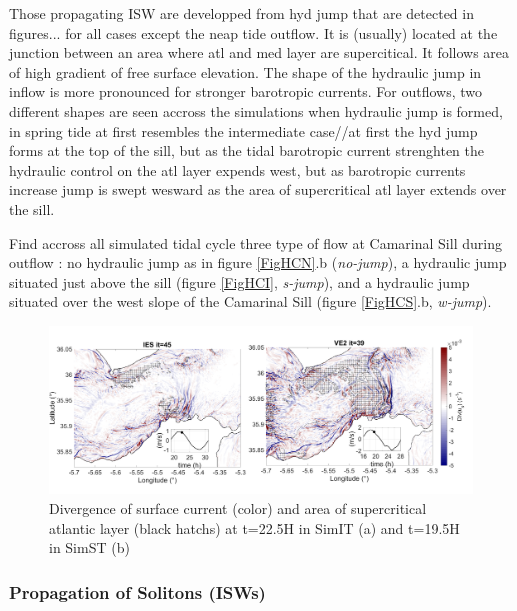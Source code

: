 Those propagating ISW are developped from hyd jump that are detected in figures... for all cases except the neap tide outflow. It is (usually) located at the junction between an area where atl and med layer are supercitical. It follows area of high gradient of free surface elevation. The shape of the hydraulic jump in inflow is more pronounced for stronger barotropic currents. For outflows, two different shapes are seen accross the simulations when hydraulic jump is formed, in spring tide at first resembles the intermediate case//at first the hyd jump forms at the top of the sill, but as the tidal barotropic current strenghten the hydraulic control on the atl layer expends west, but as barotropic currents increase jump is swept wesward as the area of supercritical atl layer extends over the sill.

Find accross all simulated tidal cycle three type of flow at Camarinal Sill during outflow : no hydraulic jump as in figure \ref{FigHCN}.b (\textit{no-jump}), a hydraulic jump situated just above the sill (figure \ref{FigHCI}, \textit{s-jump}), and a hydraulic jump situated over the west slope of the Camarinal Sill (figure \ref{FigHCS}.b, \textit{w-jump}).

\begin{figure}[!h]
 \centering
\includegraphics[width=\linewidth]{./GBR3D/FigWaveCont.png}
 \caption {Divergence of surface current (color) and area of supercritical atlantic layer (black hatchs) at t=22.5H in SimIT (a) and t=19.5H in SimST (b)}
 \label{FigISWGBR3D}
\end{figure}


\subsubsection{Propagation of Solitons (ISWs)}



